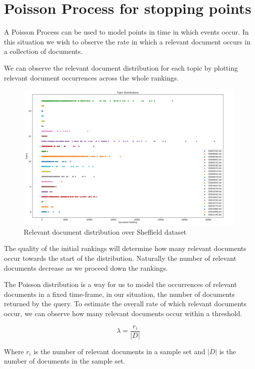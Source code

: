 \section{Poisson Process for stopping points} \label{window_samp}

A Poisson Process can be used to model points in time in which events occur. In this situation we wish to observe the rate in which a relevant document occurs in a collection of documents.

We can observe the relevant document distribution for each topic by plotting relevant document occurrences across the whole rankings.


\begin{figure}[H]
\center
\includegraphics[width=15cm]{figures/distrib.jpg}
\caption{Relevant document distribution over Sheffield dataset}
\end{figure}

The quality of the initial rankings will determine how many relevant documents occur towards the start of the distribution. Naturally the number of relevant documents decrease as we proceed down the rankings.

The Poisson distribution is a way for us to model the occurrences of relevant documents in a fixed time-frame, in our situation, the number of documents returned by the query. To estimate the overall rate of which relevant documents occur, we can observe how many relevant documents occur within a threshold.


\begin{equation}
	  \lambda = \frac{r_i}{|D|}
\end{equation}

Where $r_i$ is the number of relevant documents in a sample set and $|D|$ is the number of documents in the sample set.

